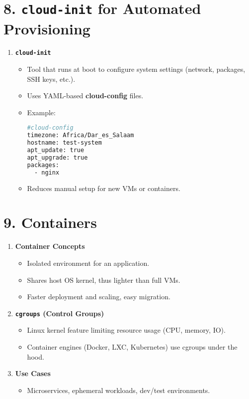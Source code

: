 \documentclass[a4paper]{report}
\begin{document}
\section*{8. \texttt{cloud-init} for Automated Provisioning}

\begin{enumerate}
    \item \textbf{\texttt{cloud-init}}
    \begin{itemize}
        \item Tool that runs at boot to configure system settings (network, packages, SSH keys, etc.).
        \item Uses YAML-based \textbf{cloud-config} files.
        \item Example:
        \begin{lstlisting}[language=bash]
#cloud-config
timezone: Africa/Dar_es_Salaam
hostname: test-system
apt_update: true
apt_upgrade: true
packages:
  - nginx
        \end{lstlisting}
        \item Reduces manual setup for new VMs or containers.
    \end{itemize}
\end{enumerate}

\section*{9. Containers}

\begin{enumerate}
    \item \textbf{Container Concepts}
    \begin{itemize}
        \item Isolated environment for an application.
        \item Shares host OS kernel, thus lighter than full VMs.
        \item Faster deployment and scaling, easy migration.
    \end{itemize}

    \item \textbf{\texttt{cgroups} (Control Groups)}
    \begin{itemize}
        \item Linux kernel feature limiting resource usage (CPU, memory, IO).
        \item Container engines (Docker, LXC, Kubernetes) use cgroups under the hood.
    \end{itemize}

    \item \textbf{Use Cases}
    \begin{itemize}
        \item Microservices, ephemeral workloads, dev/test environments.
    \end{itemize}
\end{enumerate}
\end{document}
